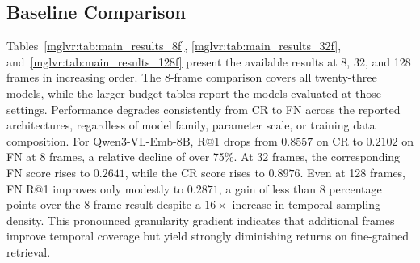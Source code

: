 \subsection{Baseline Comparison}
\label{mglvr:sec:baseline}

Tables~\ref{mglvr:tab:main_results_8f}, \ref{mglvr:tab:main_results_32f}, and~\ref{mglvr:tab:main_results_128f} present the available results at 8, 32, and 128 frames in increasing order. The 8-frame comparison covers all twenty-three models, while the larger-budget tables report the models evaluated at those settings. Performance degrades consistently from CR to FN across the reported architectures, regardless of model family, parameter scale, or training data composition. For Qwen3-VL-Emb-8B, R@1 drops from $0.8557$ on CR to $0.2102$ on FN at 8 frames, a relative decline of over 75\%. At 32 frames, the corresponding FN score rises to $0.2641$, while the CR score rises to $0.8976$. Even at 128 frames, FN R@1 improves only modestly to $0.2871$, a gain of less than 8 percentage points over the 8-frame result despite a $16\times$ increase in temporal sampling density. This pronounced granularity gradient indicates that additional frames improve temporal coverage but yield strongly diminishing returns on fine-grained retrieval.

